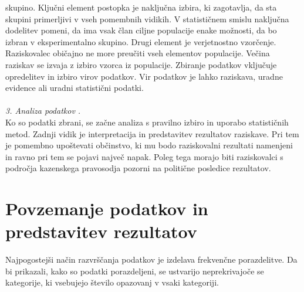 \documentclass[12pt,a4paper]{amsart}
\theoremstyle{definition} %
\theoremstyle{plain} %
\begin{document}
skupino. Ključni element postopka je naključna izbira, ki zagotavlja, da sta skupini primerljivi v vseh pomembnih vidikih. V statističnem smislu 
naključna dodelitev pomeni, da ima vsak član ciljne populacije enake možnosti, da bo izbran v eksperimentalno skupino. Drugi element je verjetnostno 
vzorčenje. Raziskovalec običajno ne more preučiti vseh elementov populacije. Večina raziskav se izvaja z izbiro vzorca iz populacije. Zbiranje podatkov 
vključuje opredelitev in izbiro virov podatkov. Vir podatkov je lahko raziskava, uradne evidence ali uradni statistični podatki.\\\\
\textit{3. Analiza podatkov .\\}
Ko so podatki zbrani, se začne analiza s pravilno izbiro in uporabo statističnih metod. Zadnji vidik je interpretacija in predstavitev rezultatov 
raziskave. Pri tem je pomembno upoštevati občinstvo, ki mu bodo raziskovalni rezultati namenjeni in ravno pri tem se pojavi največ napak. Poleg tega 
morajo biti raziskovalci s področja kazenskega pravosodja pozorni na politične posledice rezultatov. 

\section{Povzemanje podatkov in predstavitev rezultatov}
Najpogostejši način razvrščanja podatkov je izdelava frekvenčne porazdelitve. Da bi prikazali, kako so podatki porazdeljeni, se ustvarijo 
neprekrivajoče se kategorije, ki vsebujejo število opazovanj v vsaki kategoriji. \\\\
\end{document}
